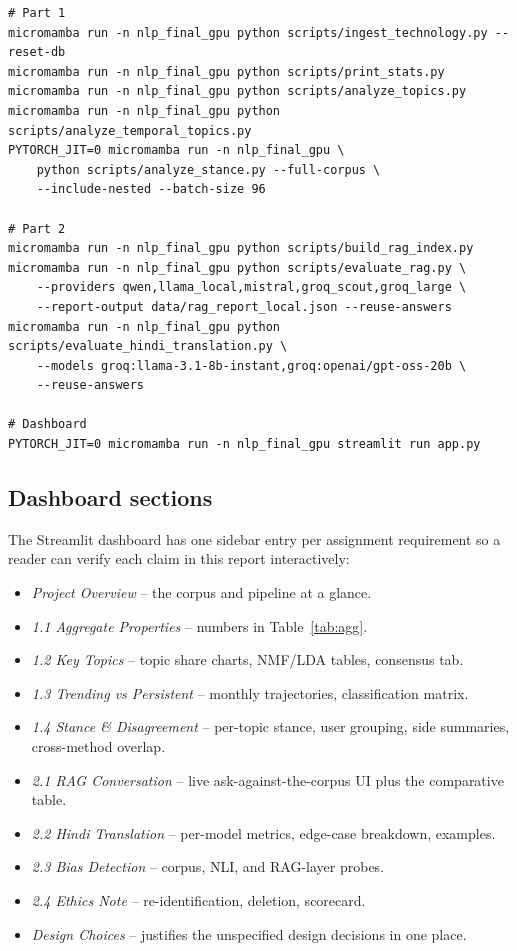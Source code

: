 \documentclass[11pt,a4paper]{article}
\begin{document}
\begin{verbatim}
# Part 1
micromamba run -n nlp_final_gpu python scripts/ingest_technology.py --reset-db
micromamba run -n nlp_final_gpu python scripts/print_stats.py
micromamba run -n nlp_final_gpu python scripts/analyze_topics.py
micromamba run -n nlp_final_gpu python scripts/analyze_temporal_topics.py
PYTORCH_JIT=0 micromamba run -n nlp_final_gpu \
    python scripts/analyze_stance.py --full-corpus \
    --include-nested --batch-size 96

# Part 2
micromamba run -n nlp_final_gpu python scripts/build_rag_index.py
micromamba run -n nlp_final_gpu python scripts/evaluate_rag.py \
    --providers qwen,llama_local,mistral,groq_scout,groq_large \
    --report-output data/rag_report_local.json --reuse-answers
micromamba run -n nlp_final_gpu python scripts/evaluate_hindi_translation.py \
    --models groq:llama-3.1-8b-instant,groq:openai/gpt-oss-20b \
    --reuse-answers

# Dashboard
PYTORCH_JIT=0 micromamba run -n nlp_final_gpu streamlit run app.py
\end{verbatim}

\subsection{Dashboard sections}

The Streamlit dashboard has one sidebar entry per assignment requirement so a reader can verify
each claim in this report interactively:

\begin{itemize}
  \item \emph{Project Overview} -- the corpus and pipeline at a glance.
  \item \emph{1.1 Aggregate Properties} -- numbers in Table~\ref{tab:agg}.
  \item \emph{1.2 Key Topics} -- topic share charts, NMF/LDA tables, consensus tab.
  \item \emph{1.3 Trending vs Persistent} -- monthly trajectories, classification matrix.
  \item \emph{1.4 Stance \& Disagreement} -- per-topic stance, user grouping, side summaries,
        cross-method overlap.
  \item \emph{2.1 RAG Conversation} -- live ask-against-the-corpus UI plus the comparative table.
  \item \emph{2.2 Hindi Translation} -- per-model metrics, edge-case breakdown, examples.
  \item \emph{2.3 Bias Detection} -- corpus, NLI, and RAG-layer probes.
  \item \emph{2.4 Ethics Note} -- re-identification, deletion, scorecard.
  \item \emph{Design Choices} -- justifies the unspecified design decisions in one place.
\end{itemize}
\end{document}
